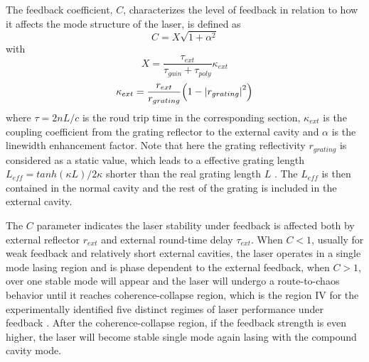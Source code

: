 The feedback coefficient, $C$, characterizes the level of feedback in relation to how it affects the mode structure of the laser, is defined as
\begin{equation}
    C=X\sqrt{1+\alpha^2}
\end{equation}
with
\begin{equation}
    X=\frac{\tau_{ext}}{\tau_{gain}+\tau_{poly}}\kappa_{ext}
\end{equation}
\begin{equation}
    \kappa_{ext}=\frac{r_{ext}}{r_{grating}}\qty(1-\abs{r_{grating}}^2)
\end{equation}
where $\tau=2nL/c$ is the roud trip time in the corresponding section, $\kappa_{ext}$ is the coupling coefficient from the grating reflector to the external cavity and $\alpha$ is the linewidth enhancement factor. Note that here the grating reflectivity $r_{grating}$ is considered as a static value, which leads to a effective grating length $L_{eff}=tanh(\kappa L)/2\kappa$ shorter than the real grating length $L$ \cite{kuznetsov1988theory}. The $L_{eff}$ is then contained in the normal cavity and the rest of the grating is included in the external cavity.

The $C$ parameter indicates the laser stability under feedback is affected both by external reflector $r_{ext}$ and external round-time delay $\tau_{ext}$. When $C<1$, usually for weak feedback and relatively short external cavities, the laser operates in a single mode lasing region and is phase dependent to the external feedback, when $C>1$, over one stable mode will appear and the laser will undergo a route-to-chaos behavior until it reaches coherence-collapse \cite{lenstra1985coherence} region, which is the region IV for the experimentally identified five distinct regimes of laser performance under feedback \cite{tkach1986regimes}. After the coherence-collapse region, if the feedback strength is even higher, the laser will become stable single mode again lasing with the compound cavity mode.


